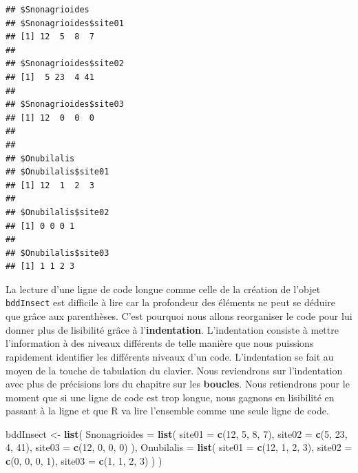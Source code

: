 \documentclass[]{book}
\makeatletter
\newenvironment{Shaded}{\begin{snugshade}}{\end{snugshade}}
\newcommand{\KeywordTok}[1]{\textcolor[rgb]{0.13,0.29,0.53}{\textbf{#1}}}
\newcommand{\DataTypeTok}[1]{\textcolor[rgb]{0.13,0.29,0.53}{#1}}
\newcommand{\DecValTok}[1]{\textcolor[rgb]{0.00,0.00,0.81}{#1}}
\newcommand{\StringTok}[1]{\textcolor[rgb]{0.31,0.60,0.02}{#1}}
\newcommand{\NormalTok}[1]{#1}
\newenvironment{kframe}{%
\medskip{}
\setlength{\fboxsep}{.8em}
 \def\at@end@of@kframe{}%
 \ifinner\ifhmode%
  \def\at@end@of@kframe{\end{minipage}}%
  \begin{minipage}{\columnwidth}%
 \fi\fi%
 \def\FrameCommand##1{\hskip\@totalleftmargin \hskip-\fboxsep
 \colorbox{shadecolor}{##1}\hskip-\fboxsep
     \hskip-\linewidth \hskip-\@totalleftmargin \hskip\columnwidth}%
 \MakeFramed {\advance\hsize-\width
   \@totalleftmargin\z@ \linewidth\hsize
   \@setminipage}}%
 {\par\unskip\endMakeFramed%
 \at@end@of@kframe}
\newenvironment{rmdblock}[1]
  {
  \begin{itemize}
  \renewcommand{\labelitemi}{
    \raisebox{-.7\height}[0pt][0pt]{
      {\setkeys{Gin}{width=3em,keepaspectratio}\texttt{[image: myIcons/\#1]}} %
    }
  }
  \setlength{\fboxsep}{1em}
  \begin{kframe}
  \item
  }
  {
  \end{kframe}
  \end{itemize}
  }
\newenvironment{rmdstyle}     %
  {\begin{rmdblock}{style}}   %
  {\end{rmdblock}}            %
\makeatother
\begin{document}
\begin{verbatim}
## $Snonagrioides
## $Snonagrioides$site01
## [1] 12  5  8  7
## 
## $Snonagrioides$site02
## [1]  5 23  4 41
## 
## $Snonagrioides$site03
## [1] 12  0  0  0
## 
## 
## $Onubilalis
## $Onubilalis$site01
## [1] 12  1  2  3
## 
## $Onubilalis$site02
## [1] 0 0 0 1
## 
## $Onubilalis$site03
## [1] 1 1 2 3
\end{verbatim}

\begin{rmdstyle}
La lecture d'une ligne de code longue comme celle de la création de
l'objet \texttt{bddInsect} est difficile à lire car la profondeur des
éléments ne peut se déduire que grâce aux parenthèses. C'est pourquoi
nous allons reorganiser le code pour lui donner plus de lisibilité grâce
à l'\textbf{indentation}. L'indentation consiste à mettre l'information
à des niveaux différents de telle manière que nous puissions rapidement
identifier les différents niveaux d'un code. L'indentation se fait au
moyen de la touche de tabulation du clavier. Nous reviendrons sur
l'indentation avec plus de précisions lors du chapitre sur les
\textbf{boucles}. Nous retiendrons pour le moment que si une ligne de
code est trop longue, nous gagnons en lisibilité en passant à la ligne
et que R va lire l'ensemble comme une seule ligne de code.
\end{rmdstyle}

\begin{Shaded}
\begin{Highlighting}[]
\NormalTok{bddInsect <-}\StringTok{ }\KeywordTok{list}\NormalTok{(}
  \DataTypeTok{Snonagrioides =} \KeywordTok{list}\NormalTok{(}
    \DataTypeTok{site01 =} \KeywordTok{c}\NormalTok{(}\DecValTok{12}\NormalTok{, }\DecValTok{5}\NormalTok{, }\DecValTok{8}\NormalTok{, }\DecValTok{7}\NormalTok{), }
    \DataTypeTok{site02 =} \KeywordTok{c}\NormalTok{(}\DecValTok{5}\NormalTok{, }\DecValTok{23}\NormalTok{, }\DecValTok{4}\NormalTok{, }\DecValTok{41}\NormalTok{), }
    \DataTypeTok{site03 =} \KeywordTok{c}\NormalTok{(}\DecValTok{12}\NormalTok{, }\DecValTok{0}\NormalTok{, }\DecValTok{0}\NormalTok{, }\DecValTok{0}\NormalTok{)}
\NormalTok{  ), }
  \DataTypeTok{Onubilalis =} \KeywordTok{list}\NormalTok{(}
    \DataTypeTok{site01 =} \KeywordTok{c}\NormalTok{(}\DecValTok{12}\NormalTok{, }\DecValTok{1}\NormalTok{, }\DecValTok{2}\NormalTok{, }\DecValTok{3}\NormalTok{), }
    \DataTypeTok{site02 =} \KeywordTok{c}\NormalTok{(}\DecValTok{0}\NormalTok{, }\DecValTok{0}\NormalTok{, }\DecValTok{0}\NormalTok{, }\DecValTok{1}\NormalTok{), }
    \DataTypeTok{site03 =} \KeywordTok{c}\NormalTok{(}\DecValTok{1}\NormalTok{, }\DecValTok{1}\NormalTok{, }\DecValTok{2}\NormalTok{, }\DecValTok{3}\NormalTok{)}
\NormalTok{  )}
\NormalTok{)}
\end{Highlighting}
\end{Shaded}
\end{document}
